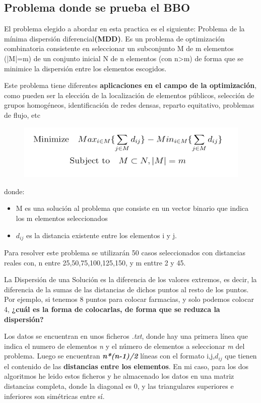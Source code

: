\documentclass{article}
\begin{document}
\subsection{\normalsize Problema donde se prueba el BBO}\large El problema elegido a abordar en esta practica es el siguiente:
Problema de la mínima dispersión diferencial\textbf{(MDD)}.
Es un problema de optimización combinatoria consistente en
seleccionar un subconjunto M de m elementos (|M|=m) de un conjunto inicial N de n
elementos (con n>m) de forma que se minimice la dispersión entre los elementos
escogidos.

Este problema tiene diferentes \textbf{aplicaciones en el campo de la optimización},
como pueden ser la elección de la localización de elementos públicos, selección
de grupos homogéneos, identificación de redes densas, reparto equitativo, problemas
de flujo, etc

\begin{figure}[h]
	\centering
	\includegraphics[scale=0.5]{FormulaMinimizacion.png}
\end{figure}

donde:
\begin{itemize}
	\item M es una solución al problema que consiste en un vector binario que indica los m
	      elementos seleccionados
	      \item$d_{ij}$ es la distancia existente entre los elementos i y j.
\end{itemize}

Para resolver este problema se utilizarán 50 casos seleccionados con distancias reales
con, n entre {25,50,75,100,125,150}, y m enttre 2 y 45.

\vspace{5mm}

La Dispersión de una Solución es la diferencia de los valores extremos, es decir,
la diferencia de la sumas de las distancias de dichos puntos al resto de los puntos.
Por ejemplo, si tenemos 8 puntos para colocar farmacias, y solo podemos colocar 4,
\textbf{¿cuál es la forma de colocarlas, de forma que se reduzca la dispersión?}

Los datos se encuentran en unos ficheros \emph{.txt}, donde hay una primera línea
que indica el numero de elementos \emph{n} y el número de elementos a seleccionar
\emph{m} del problema.
\newline Luego se encuentran \textbf{\emph{n*(n-1)/2}} líneas con el formato i,j,$d_{ij}$ que
tienen el contenido de las \textbf{distancias entre los elementos}.
\newline En mi caso, para los dos algoritmos he leido estos ficheros
y he almacenado los datos en una matriz distancias completa, donde la diagonal es 0,
y las triangulares superiores e inferiores son simétricas entre sí.
\end{document}
